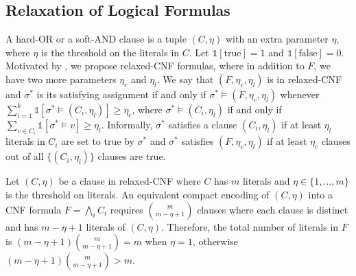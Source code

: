 \subsection{Relaxation of Logical Formulas}

A hard-OR or a soft-AND clause is a tuple $ (C,\eta) $ with an extra parameter $ \eta $, where $ \eta $ is the threshold on the literals in $ C $. Let $ \mathds{1}[\text{true}]=1 $ and $ \mathds{1}[\text{false}]=0 $. Motivated by , we propose relaxed-CNF formulas, where in addition to $F$, we have two more parameters $\eta_c$ and $\eta_l$. We say that $(F,\eta_c, \eta_l)$ is in relaxed-CNF and $ \sigma^* $ is its satisfying assignment if and only if $\sigma^* \models (F,\eta_c, \eta_l)$ whenever $\sum_{i=1}^k \mathds{1}[\sigma^* \models (C_i,\eta_l)] \ge \eta_c$, where $\sigma^* \models (C_i, \eta_l)$ if and only if $\sum_{v \in C_i} \mathds{1}[\sigma^* \models v] \geq \eta_l$. Informally,  $\sigma^*$ satisfies a clause $(C_i, \eta_l)$ if  at least $\eta_l$ literals in $C_i$ are set to true by $\sigma^*$ and $\sigma^*$ satisfies $(F,\eta_c, \eta_l)$ if at least $\eta_c$  clauses out of all $\{(C_i,\eta_l)\}$ clauses are true. 


\begin{theorem}
	\label{interpretability_crr_thm:succinctness}	
	Let $ (C,\eta) $ be a clause in relaxed-CNF where  $ C $ has $ m  $ literals and $ \eta \in \{1,\dots,m\} $ is the threshold on literals.  An equivalent compact encoding of $ (C,\eta) $  into a CNF formula $ F= \bigwedge_i C_i $ requires $ {m \choose{m-\eta+1}} $  clauses where each clause is distinct and has $ m-\eta+1 $ literals of $ (C,\eta) $. Therefore,  the total number of literals in $ F $ is $ (m-\eta+1){m\choose{m-\eta+1}} = m $ when $ \eta=1 $, otherwise $ (m-\eta+1){m\choose{m-\eta+1}} > m $.
\end{theorem}


